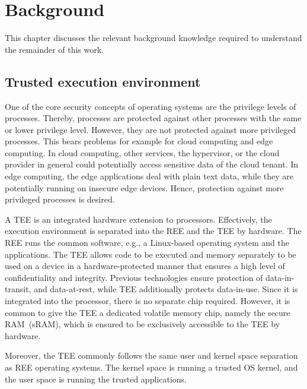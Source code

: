 
\chapter{Background}\label{chapter:background}

This chapter discusses the relevant background knowledge required to understand the remainder of this work.

\section{Trusted execution environment}

One of the core security concepts of operating systems are the privilege levels of processes. Thereby, processes are protected against other processes with the same or lower privilege level. However, they are not protected against more privileged processes. This bears problems for example for cloud computing and edge computing. In cloud computing, other services, the hypervisor, or the cloud provider in general could potentially access sensitive data of the cloud tenant. In edge computing, the edge applications deal with plain text data, while they are potentially running on insecure edge devices. Hence, protection against more privileged processes is desired.


A \ac{TEE} is an integrated hardware extension to processors. Effectively, the execution environment is separated into the \ac{REE} and the \ac{TEE} by hardware. The \ac{REE} runs the common software, e.g., a Linux-based operating system and the applications. The TEE allows code to be executed and memory separately to be used on a device in a hardware-protected manner that ensures a high level of confidentiality and integrity.
Previous technologies ensure protection of data-in-transit, and data-at-rest, while \ac{TEE} additionally protects data-in-use.
Since it is integrated into the processor, there is no separate chip required. However, it is common to give the \ac{TEE} a dedicated volatile memory chip, namely the secure RAM~(sRAM), which is ensured to be exclusively accessible to the \ac{TEE} by hardware.

Moreover, the \ac{TEE} commonly follows the same user and kernel space separation as \ac{REE} operating systems. The kernel space is running a trusted OS kernel, and the user space is running the trusted applications.


